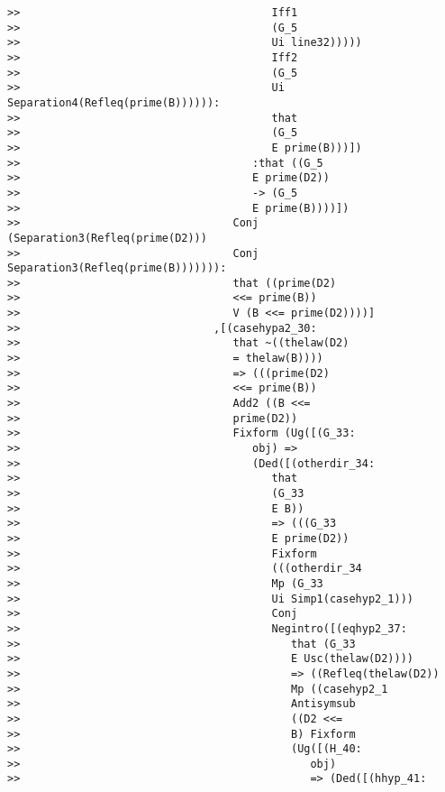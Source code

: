 \documentclass[12pt]{article}
\begin{document}
\begin{verbatim}
>>                                       Iff1
>>                                       (G_5
>>                                       Ui line32)))))
>>                                       Iff2
>>                                       (G_5
>>                                       Ui Separation4(Refleq(prime(B)))))):
>>                                       that
>>                                       (G_5
>>                                       E prime(B)))])
>>                                    :that ((G_5
>>                                    E prime(D2))
>>                                    -> (G_5
>>                                    E prime(B))))])
>>                                 Conj (Separation3(Refleq(prime(D2)))
>>                                 Conj Separation3(Refleq(prime(B))))))):
>>                                 that ((prime(D2)
>>                                 <<= prime(B))
>>                                 V (B <<= prime(D2))))]
>>                              ,[(casehypa2_30:
>>                                 that ~((thelaw(D2)
>>                                 = thelaw(B))))
>>                                 => (((prime(D2)
>>                                 <<= prime(B))
>>                                 Add2 ((B <<=
>>                                 prime(D2))
>>                                 Fixform (Ug([(G_33:
>>                                    obj) =>
>>                                    (Ded([(otherdir_34:
>>                                       that
>>                                       (G_33
>>                                       E B))
>>                                       => (((G_33
>>                                       E prime(D2))
>>                                       Fixform
>>                                       (((otherdir_34
>>                                       Mp (G_33
>>                                       Ui Simp1(casehyp2_1)))
>>                                       Conj
>>                                       Negintro([(eqhyp2_37:
>>                                          that (G_33
>>                                          E Usc(thelaw(D2))))
>>                                          => ((Refleq(thelaw(D2))
>>                                          Mp ((casehyp2_1
>>                                          Antisymsub
>>                                          ((D2 <<=
>>                                          B) Fixform
>>                                          (Ug([(H_40:
>>                                             obj)
>>                                             => (Ded([(hhyp_41:

\end{verbatim}
\end{document}
